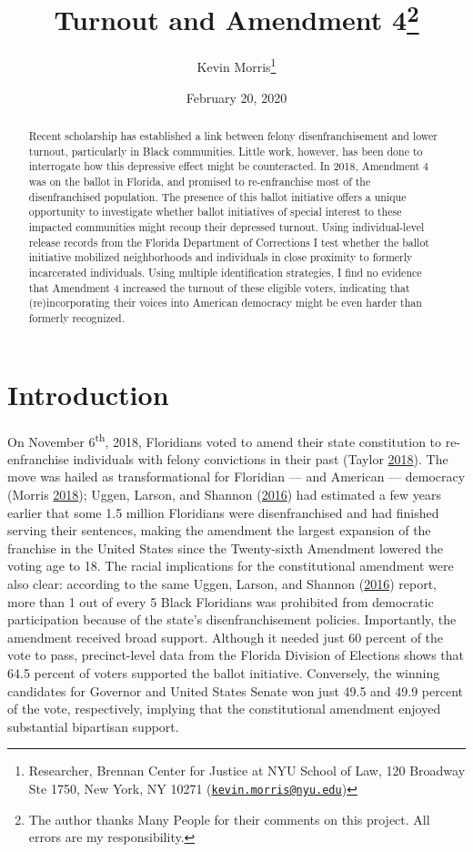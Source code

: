 \documentclass[
  12pt,
]{article}
\title{Turnout and Amendment 4\thanks{The author thanks Many People for their comments on this project. All errors are my responsibility.}}
\author{Kevin Morris\footnote{Researcher, Brennan Center for Justice at NYU School of Law, 120 Broadway Ste 1750, New York, NY 10271 (\href{mailto:kevin.morris@nyu.edu}{\nolinkurl{kevin.morris@nyu.edu}})}}
\date{February 20, 2020}
\begin{document}
\maketitle
\begin{abstract}
Recent scholarship has established a link between felony disenfranchisement and lower turnout, particularly in Black communities. Little work, however, has been done to interrogate how this depressive effect might be counteracted. In 2018, Amendment 4 was on the ballot in Florida, and promised to re-enfranchise most of the disenfranchised population. The presence of this ballot initiative offers a unique opportunity to investigate whether ballot initiatives of special interest to these impacted communities might recoup their depressed turnout. Using individual-level release records from the Florida Department of Corrections I test whether the ballot initiative mobilized neighborhoods and individuals in close proximity to formerly incarcerated individuals. Using multiple identification strategies, I find no evidence that Amendment 4 increased the turnout of these eligible voters, indicating that (re)incorporating their voices into American democracy might be even harder than formerly recognized.
\end{abstract}

\pagebreak


\hypertarget{introduction}{%
\section*{Introduction}\label{introduction}}

On November 6\textsuperscript{th}, 2018, Floridians voted to amend their state constitution to re-enfranchise individuals with felony convictions in their past (Taylor \protect\hyperlink{ref-Taylor2018}{2018}). The move was hailed as transformational for Floridian --- and American --- democracy (Morris \protect\hyperlink{ref-Morris2018}{2018}); Uggen, Larson, and Shannon (\protect\hyperlink{ref-sentencing_2016}{2016}) had estimated a few years earlier that some 1.5 million Floridians were disenfranchised and had finished serving their sentences, making the amendment the largest expansion of the franchise in the United States since the Twenty-sixth Amendment lowered the voting age to 18. The racial implications for the constitutional amendment were also clear: according to the same Uggen, Larson, and Shannon (\protect\hyperlink{ref-sentencing_2016}{2016}) report, more than 1 out of every 5 Black Floridians was prohibited from democratic participation because of the state's disenfranchisement policies. Importantly, the amendment received broad support. Although it needed just 60 percent of the vote to pass, precinct-level data from the Florida Division of Elections shows that 64.5 percent of voters supported the ballot initiative. Conversely, the winning candidates for Governor and United States Senate won just 49.5 and 49.9 percent of the vote, respectively, implying that the constitutional amendment enjoyed substantial bipartisan support.
\end{document}

